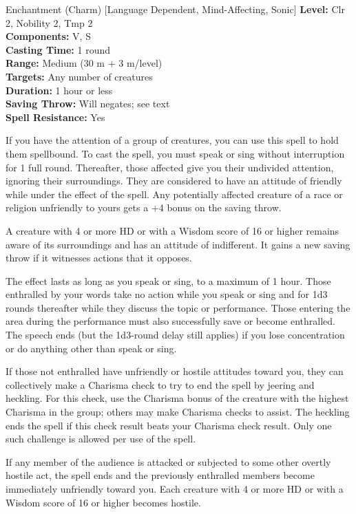 {Enchantment (Charm) [Language Dependent, Mind-Affecting, Sonic]}
{
	\textbf{Level:}
	Clr 2, Nobility 2, Tmp 2\\
	\textbf{Components:}
	V, S\\
	\textbf{Casting Time:}
	1 round\\
	\textbf{Range:}
	Medium (30 m + 3 m/level)\\
	\textbf{Targets:}
	Any number of creatures\\
	\textbf{Duration:}
	1 hour or less\\
	\textbf{Saving Throw:}
	Will negates; see text\\
	\textbf{Spell Resistance:}
	Yes\\
}
{
	If you have the attention of a group of creatures, you can use this spell to hold them spellbound. To cast the spell, you must speak or sing without interruption for 1 full round. Thereafter, those affected give you their undivided attention, ignoring their surroundings. They are considered to have an attitude of friendly while under the effect of the spell. Any potentially affected creature of a race or religion unfriendly to yours gets a +4 bonus on the saving throw.

	A creature with 4 or more HD or with a Wisdom score of 16 or higher remains aware of its surroundings and has an attitude of indifferent. It gains a new saving throw if it witnesses actions that it opposes.

	The effect lasts as long as you speak or sing, to a maximum of 1 hour. Those enthralled by your words take no action while you speak or sing and for 1d3 rounds thereafter while they discuss the topic or performance. Those entering the area during the performance must also successfully save or become enthralled. The speech ends (but the 1d3-round delay still applies) if you lose concentration or do anything other than speak or sing.

	If those not enthralled have unfriendly or hostile attitudes toward you, they can collectively make a Charisma check to try to end the spell by jeering and heckling. For this check, use the Charisma bonus of the creature with the highest Charisma in the group; others may make Charisma checks to assist. The heckling ends the spell if this check result beats your Charisma check result. Only one such challenge is allowed per use of the spell.

	If any member of the audience is attacked or subjected to some other overtly hostile act, the spell ends and the previously enthralled members become immediately unfriendly toward you. Each creature with 4 or more HD or with a Wisdom score of 16 or higher becomes hostile.

}
